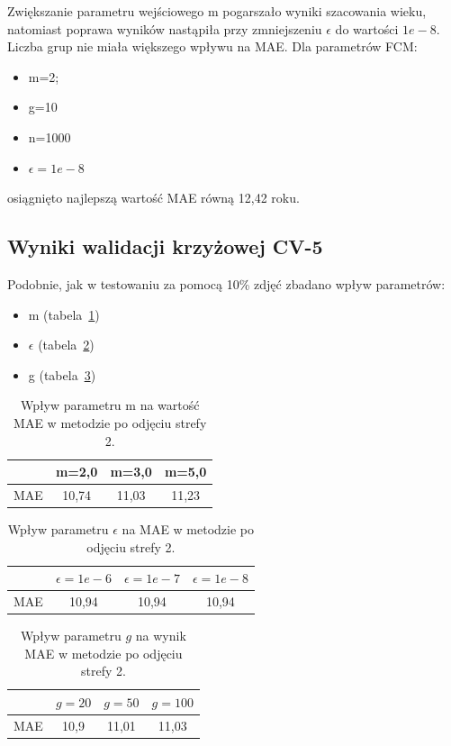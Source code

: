 \documentclass[a4paper,twoside,12pt]{book}
\begin{document}
    Zwiększanie parametru wejściowego m pogarszało wyniki szacowania wieku, natomiast poprawa wyników nastąpiła przy
    zmniejszeniu $\epsilon$ do wartości $1e-8$. Liczba grup nie miała większego wpływu na MAE.
    Dla parametrów FCM:
    \begin{itemize}
        \item m=2;
        \item g=10
        \item n=1000
        \item $\epsilon=1e-8$
    \end{itemize}
    osiągnięto najlepszą wartość MAE równą 12,42 roku.

    \subsection*{Wyniki walidacji krzyżowej CV-5}

    Podobnie, jak w testowaniu za pomocą 10\% zdjęć zbadano wpływ parametrów:
    \begin{itemize}
        \item m (tabela~\ref{tab.odjeta_m_cv})
        \item $\epsilon$ (tabela~\ref{tab.odjeta_e_cv})
        \item g (tabela~\ref{tab.odjeta_g_cv})
    \end{itemize}

    \begin{table}[h!]
        \centering
        \caption{Wpływ parametru m na wartość MAE w metodzie po odjęciu strefy 2.}
        \begin{tabular}{|c|c|c|c|}
            \hline
            & m=2,0 & m=3,0 & m=5,0 \\ \hline
            MAE & 10,74 & 11,03 & 11,23 \\ \hline
        \end{tabular}
        \label{tab.odjeta_m_cv}
    \end{table}
    \begin{table}[h!]
        \centering
        \caption{Wpływ parametru $\epsilon$ na MAE w metodzie po odjęciu strefy 2.}
        \begin{tabular}{|c|c|c|c|}
            \hline
            & $\epsilon=1e-6$ & $\epsilon=1e-7$ & $\epsilon=1e-8$ \\ \hline
            MAE & 10,94 & 10,94 & 10,94 \\ \hline
        \end{tabular}
        \label{tab.odjeta_e_cv}
    \end{table}
    \begin{table}[h!]
        \centering
        \caption{Wpływ parametru $g$ na wynik MAE w metodzie po odjęciu strefy 2.}
        \begin{tabular}{|c|c|c|c|}
            \hline
            & $g=20$ & $g=50$ & $g=100$ \\ \hline
            MAE & 10,9 & 11,01 & 11,03 \\ \hline
        \end{tabular}
        \label{tab.odjeta_g_cv}
    \end{table}
\end{document}
